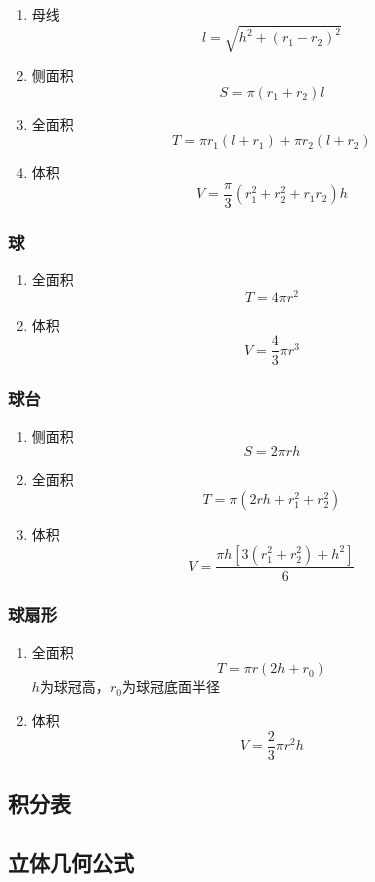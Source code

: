 \documentclass[a4paper]{article}
\begin{document}
\begin{enumerate}
	\item 母线
	$$l=\sqrt{h^2+(r_1-r_2)^2}$$
	\item 侧面积
	$$S=\pi(r_1+r_2)l$$
	\item 全面积
	$$T=\pi r_1(l+r_1)+\pi r_2(l+r_2)$$
	\item 体积
	$$V=\frac{\pi}{3}(r_1^2+r_2^2+r_1r_2)h$$
\end{enumerate}

\subsubsection{球}

\begin{enumerate}
	\item 全面积
	$$T=4\pi r^2$$
	\item 体积
	$$V=\frac{4}{3}\pi r^3$$
\end{enumerate}

\subsubsection{球台}

\begin{enumerate}
	\item 侧面积
	$$S=2\pi rh$$
	\item 全面积
	$$T=\pi(2rh+r_1^2+r_2^2)$$
	\item 体积
	$$V=\frac{\pi h[3(r_1^2+r_2^2)+h^2]}{6}$$
\end{enumerate}

\subsubsection{球扇形}

\begin{enumerate}
	\item 全面积
	$$T=\pi r(2h+r_0)$$
	$h$为球冠高，$r_0$为球冠底面半径
	\item 体积
	$$V=\frac{2}{3}\pi r^2h$$
\end{enumerate}

\subsection{积分表}


\subsection{立体几何公式}
\end{document}
